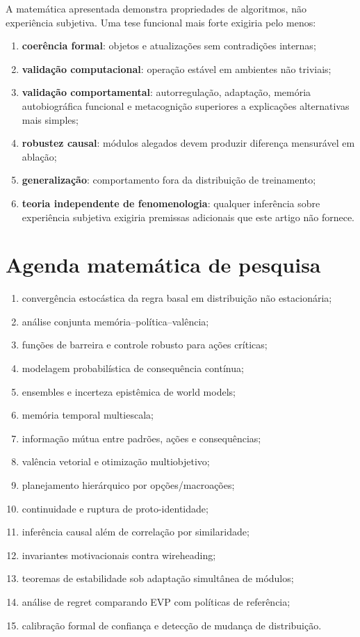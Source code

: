 A matemática apresentada demonstra propriedades de algoritmos, não experiência subjetiva. Uma tese funcional mais forte exigiria pelo menos:
\begin{enumerate}
\item \textbf{coerência formal}: objetos e atualizações sem contradições internas;
\item \textbf{validação computacional}: operação estável em ambientes não triviais;
\item \textbf{validação comportamental}: autorregulação, adaptação, memória autobiográfica funcional e metacognição superiores a explicações alternativas mais simples;
\item \textbf{robustez causal}: módulos alegados devem produzir diferença mensurável em ablação;
\item \textbf{generalização}: comportamento fora da distribuição de treinamento;
\item \textbf{teoria independente de fenomenologia}: qualquer inferência sobre experiência subjetiva exigiria premissas adicionais que este artigo não fornece.
\end{enumerate}

\section{Agenda matemática de pesquisa}

\begin{enumerate}
\item convergência estocástica da regra basal em distribuição não estacionária;
\item análise conjunta memória--política--valência;
\item funções de barreira e controle robusto para ações críticas;
\item modelagem probabilística de consequência contínua;
\item ensembles e incerteza epistêmica de world models;
\item memória temporal multiescala;
\item informação mútua entre padrões, ações e consequências;
\item valência vetorial e otimização multiobjetivo;
\item planejamento hierárquico por opções/macroações;
\item continuidade e ruptura de proto-identidade;
\item inferência causal além de correlação por similaridade;
\item invariantes motivacionais contra wireheading;
\item teoremas de estabilidade sob adaptação simultânea de módulos;
\item análise de regret comparando EVP com políticas de referência;
\item calibração formal de confiança e detecção de mudança de distribuição.
\end{enumerate}


